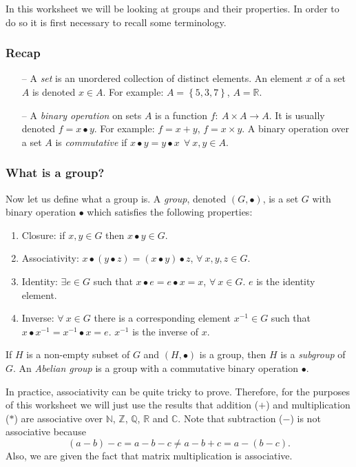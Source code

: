 In this worksheet we will be looking at groups and their properties. In order to do so it is first necessary to recall some terminology.
\subsubsection*{Recap}
\begin{itemize}
 \item[--] A {\em set} is an unordered collection of distinct elements. An element $x$ of a set $A$ is denoted $x \in A$. \newline For example: $A=\left\{ 5, 3,7 \right\}$, $A=\mathbb{R}$.
 \item[--] A {\em binary operation} on sets $A$ is a function $f:\:A \times A \to A$. It is usually denoted $f=x\bullet y$. \newline For example: $f=x+y$, $f=x\times y$. \newline
 A binary operation over a set $A$ is {\em commutative} if $x \bullet y = y \bullet x ~~\forall \: x,y \in A$. 
\end{itemize}

\subsubsection*{What is a group?}
Now let us define what a group is. A {\em group}, denoted $(G,\bullet)$, is a set $G$ with binary operation $\bullet$ which satisfies the following properties:
\begin{enumerate}
 \item Closure: if $x,y\in G$ then $x\bullet y \in G$.
 \item Associativity:  $x \bullet (y \bullet z)=(x\bullet y)\bullet z$, $\forall \: x,y,z \in G$.
 \item Identity: $\exists e\in G$ such that $x \bullet e = e \bullet x = x$, $\forall \: x \in G$. $e$ is the identity element.
 \item Inverse: $\forall \: x\in G$ there is a corresponding element $x^{-1}\in G$ such that $x \bullet x^{-1}=x^{-1} \bullet x=e$. $x^{-1}$ is the inverse of $x$.
\end{enumerate}

If $H$ is a non-empty subset of $G$ and $(H,\bullet)$ is a group, then $H$ is a {\em subgroup} of $G$. 
An {\em Abelian group} is a group with a commutative binary operation $\bullet$.

In practice, associativity can be quite tricky to prove. Therefore, for the purposes of this worksheet we will just use the results that addition ($+$) and multiplication ($*$) are associative over $\mathbb{N}$, $\mathbb{Z}$, $\mathbb{Q}$, $\mathbb{R}$ and $\mathbb{C}$. Note that subtraction ($-$) is not associative because
\begin{equation*}
 (a-b)-c=a-b-c\neq a-b+c = a-(b-c).
\end{equation*}
Also, we are given the fact that matrix multiplication is associative.\\

